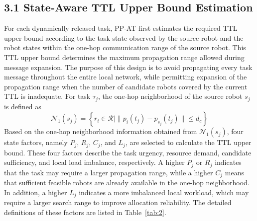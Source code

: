 \documentclass[type=submission,name=IR]{oae}
\begin{document}
\subsection{3.1 State-Aware TTL Upper Bound Estimation}
For each dynamically released task, PP-AT first estimates the required TTL upper bound according to the task state observed by the source robot and the robot states within the one-hop communication range of the source robot. This TTL upper bound determines the maximum propagation range allowed during message expansion. The purpose of this design is to avoid propagating every task message throughout the entire local network, while permitting expansion of the propagation range when the number of candidate robots covered by the current TTL is inadequate.
For task $\tau_j$, the one-hop neighborhood of the source robot $s_j$ is defined as
\[
\mathcal{N}_1(s_j)=
\left\{
r_i\in\mathcal{R}
\mid
\|p_i(t_j)-p_{s_j}(t_j)\|\leq d_c
\right\}
\]
Based on the one-hop neighborhood information obtained from $\mathcal{N}_1(s_j)$, four state factors, namely $P_j$, $R_j$, $C_j$, and $L_j$, are selected to calculate the TTL upper bound. These four factors describe the task urgency, resource demand, candidate sufficiency, and local load imbalance, respectively. A higher $P_j$ or $R_j$ indicates that the task may require a larger propagation range, while a higher $C_j$ means that sufficient feasible robots are already available in the one-hop neighborhood. In addition, a higher $L_j$ indicates a more imbalanced local workload, which may require a larger search range to improve allocation reliability. The detailed definitions of these factors are listed in Table~\ref{tab:2}.
\end{document}
